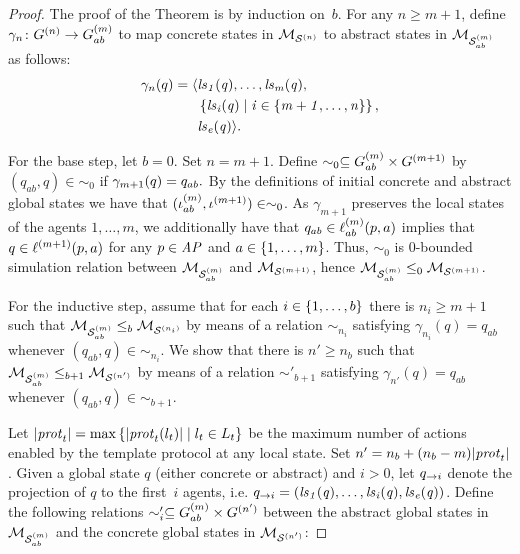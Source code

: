 \documentclass{article}
\begin{document}
\begin{proof}

The proof of the Theorem is by induction on~$b$. For any $n \geq m+1$,  define
$\gamma_n \colon G^{(n)} \rightarrow G^{(m)}_{ab}$ to map concrete
states in $\mathcal{M}_{\mathcal{S}^{(n)}}$ to abstract states in $\mathcal{M}_{\mathcal{S}_{ab}^{(m)}}$ as follows:
\begin{align*}
  \gamma_n(q) =  \langle &\it{ls}_{1}(q), \ldots, \it{ls}_{m}(q), \\
  &\left \{ \it{ls}_{i}(q) \mid i \in \left \{ m + 1, \ldots, n \right \} \right \}, \\
  &\it{ls}_{e}(q)  \rangle.
\end{align*}

For the base step, let $b = 0$. Set $n = m+1$. Define $\sim_0 \subseteq 
    G^{(m)}_{ab} \times G^{(m+1)}$ by $(q_{ab}, q) \in \sim_0$ if 
$\gamma_{m+1}(q) = q_{ab}.$
By the definitions of
    initial concrete and abstract global states we have that $(\iota^{({m})}_{ab},
    \iota^{({m+1})}) \in \sim_0$.  
    As $\gamma_{m+1}$ preserves
the local states of the agents $1, \ldots, m$, we additionally have that $q_{ab} \in
\ell^{(m)}_{ab}(p, a)$ implies that $q \in \ell^{(m+1)}(p, a)$ for any $p \in
\it{AP}$ and $a \in \left \{ 1, \ldots, m \right \}$. Thus,  $\sim_0$ is $0$-bounded
simulation relation between $\mathcal{M}_{\mathcal{S}_{ab}^{(m)}}$ and $\mathcal{M}_{\mathcal{S}^{(m+1)}}$, hence $\mathcal{M}_{\mathcal{S}_{ab}^{(m)}} \leq_0 \mathcal{M}_{\mathcal{S}^{(m+1)}}$.

 For the inductive step, assume that for each $i \in
    \left \{ 1, \ldots, b \right \}$ there is $n_i \geq m + 1$ such that $\mathcal{M}_{\mathcal{S}_{ab}^{(m)}} \leq_b
    \mathcal{M}_{\mathcal{S}^{(n_i)}}$ by means of a relation $\sim_{n_i}$ satisfying
    $\gamma_{n_i}(q)=q_{ab}$ whenever $(q_{ab}, q) \in \sim_{n_i}$.
    We show that there is $n' \geq n_b$ such that $\mathcal{M}_{\mathcal{S}_{ab}^{(m)}} \leq_{b+1}
    \mathcal{M}_{\mathcal{S}^{(n')}}$ by means of a relation $\sim'_{b+1}$ satisfying
$\gamma_{n'}(q)=q_{ab}$ whenever  $(q_{ab}, q) \in
    \sim_{b+1}$.
    

    Let $|\mathit{prot}_{t}| = \max \left \{ |\mathit{prot}_{t}(l_t)| \mid l_t \in L_{t} \right \}$ be the
    maximum number of actions enabled by the template protocol at any local
    state. Set $n' = n_b +  (n_b -m) |\mathit{prot}_{t}|$.  Given a
    global state $q$ (either concrete or abstract) and $i > 0$, let
    $q_{\rightarrow i}$ denote the projection of $q$ to the first~$i$ agents,
    i.e. $q_{\rightarrow i} = \left ( \it{ls}_{1}(q), \ldots, \it{ls}_{i}(q), \it{ls}_{e}(q) \right )$.
    Define the following relations $\sim'_i \subseteq G^{(m)}_{ab} \times
    G^{(n')}$ between the abstract global states in $\mathcal{M}_{\mathcal{S}_{ab}^{(m)}}$ and the
    concrete global states in $\mathcal{M}_{\mathcal{S}^{(n')}}$:


\end{proof}
\end{document}
